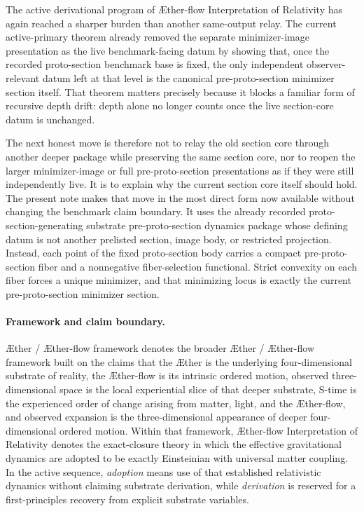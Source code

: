 \documentclass[11pt]{article}
\newcommand{\Aether}{\AE{}ther}
\newcommand{\Aflow}{\AE{}ther-flow}
\newcommand{\TheoryName}{\Aflow{} Interpretation of Relativity}
\newcommand{\TheoryProgram}{\Aether{} / \Aflow{} framework}
\begin{document}
The active derivational program of \TheoryName{} has again reached a sharper burden than another same-output relay. The current active-primary theorem already removed the separate minimizer-image presentation as the live benchmark-facing datum by showing that, once the recorded proto-section benchmark base is fixed, the only independent observer-relevant datum left at that level is the canonical pre-proto-section minimizer section itself. That theorem matters precisely because it blocks a familiar form of recursive depth drift: depth alone no longer counts once the live section-core datum is unchanged.

The next honest move is therefore not to relay the old section core through another deeper package while preserving the same section core, nor to reopen the larger minimizer-image or full pre-proto-section presentations as if they were still independently live. It is to explain why the current section core itself should hold. The present note makes that move in the most direct form now available without changing the benchmark claim boundary. It uses the already recorded proto-section-generating substrate pre-proto-section dynamics package whose defining datum is not another prelisted section, image body, or restricted projection. Instead, each point of the fixed proto-section body carries a compact pre-proto-section fiber and a nonnegative fiber-selection functional. Strict convexity on each fiber forces a unique minimizer, and that minimizing locus is exactly the current pre-proto-section minimizer section.

\paragraph{Framework and claim boundary.}
\TheoryProgram{} denotes the broader \Aether{} / \Aflow{} framework built on the claims that the \Aether{} is the underlying four-dimensional substrate of reality, the \Aflow{} is its intrinsic ordered motion, observed three-dimensional space is the local experiential slice of that deeper substrate, S-time is the experienced order of change arising from matter, light, and the \Aflow{}, and observed expansion is the three-dimensional appearance of deeper four-dimensional ordered motion. Within that framework, \TheoryName{} denotes the exact-closure theory in which the effective gravitational dynamics are adopted to be exactly Einsteinian with universal matter coupling. In the active sequence, \emph{adoption} means use of that established relativistic dynamics without claiming substrate derivation, while \emph{derivation} is reserved for a first-principles recovery from explicit substrate variables.
\end{document}
